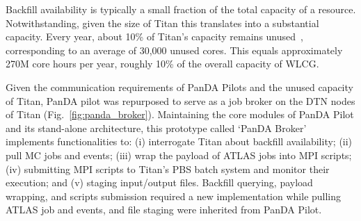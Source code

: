 
Backfill availability is typically a small fraction of the total capacity  of a
resource. Notwithstanding,  given the size of Titan this translates into a
substantial capacity. Every year, about 10\% of Titan's capacity remains
unused~\cite{barker2016us}, corresponding to an average of 30,000 unused cores.
This equals approximately 270M core hours per year, roughly 10\% of the overall
capacity of WLCG.



Given the communication requirements of PanDA Pilots and the unused capacity of
Titan, PanDA pilot was repurposed to serve as a job broker on the DTN nodes of
Titan (Fig.~\ref{fig:panda_broker}). Maintaining the core modules of PanDA Pilot
and its stand-alone architecture, this prototype called `PanDA Broker'
implements functionalities to: (i) interrogate Titan about backfill
availability; (ii) pull MC jobs and events; (iii) wrap the payload of ATLAS jobs
into MPI scripts; (iv) submitting MPI scripts to Titan's PBS batch system and
monitor their execution; and (v) staging input/output files. Backfill querying,
payload wrapping, and scripts submission required a new implementation while
pulling ATLAS job and events, and file staging were inherited from PanDA Pilot.

